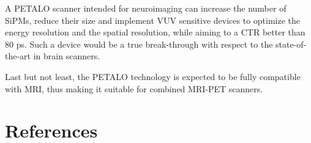\documentclass[review]{elsarticle}
\begin{document}
A PETALO scanner intended for neuroimaging can increase the number of SiPMs, reduce their size and implement VUV sensitive devices to optimize the energy resolution and the spatial resolution, while aiming to a  CTR  better than 80 ps. Such a device would be a true break-through with respect to the state-of-the-art in brain scanners. 

Last but not least, the PETALO technology is expected to be fully compatible with MRI, thus making it suitable for combined MRI-PET scanners. 


\section*{References}


\end{document}
